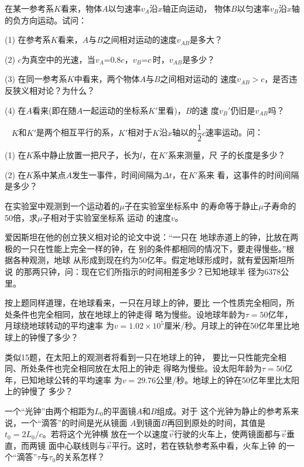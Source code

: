 \begin{exercises}
\exercise 在某一参考系$K$看来，物体$A$以匀速率$v_A$沿$x$轴正向运动，
物体$B$以匀速率$v_B$沿$x$轴的负方向运动。试问：

(1) 在参考系\*$K$\*看来，\!$A$\*与\*$B$\*之间相对运动的速度\*$v_{A\!B}$\*是多大？

(2) $c$\*为真空中的光速，当\*$ v _ { A }$=0.8$ c $，\!$ v _ { B }$=$ c  $\,时，\!$v_{A\!B}$\*是多少？

(3) 在同一参考系$K$中看来，两个物体$A$与$B$之间相对运动的
速度$ v _ { A B } > c  $，是否违反狭义相对论？为什么？

(4) 在$A$看来(即在随$A$一起运动的坐标系$K'$里看)，$B$的速
度$ v _ B ' $仍旧是$v_{AB}$吗？

\exercise~ $K$和$K'$是两个相互平行的系，$K'$相对于$K$沿$x$轴以的$\dfrac { 1 } { 2 } c $速率运动。问：

(1) 在$K$系中静止放置一把尺子，长为$l$，在$K'$系来测量，尺
子的长度是多少？

(2) 在$K$系中某点$A$发生一事件，时间间隔为$\Delta t$，在$K'$系来
看，这事件的时间间隔是多少？

\exercise 在实验室中观测到一个运动着的$\mu$子在实验室坐标系中
的寿命等于静止$\mu$子寿命的50倍，求$\mu$子相对于实验室坐标系
运动
的速度$v$。

\exercise 爱因斯坦在他的创立狭义相对论的论文中说：“一只在
地球赤道上的钟，比放在两极的一只在性能上完全一样的钟，在
别的条件都相同的情况下，要走得慢些。”根据各种观测，地球
从形成到现在约为50亿年。假定地球形成时，就有爱因斯坦所说
的那两只钟，问：现在它们所指示的时间相差多少？已知地球半
径为6378公里。\vspace{-0.14em}

\exercise 按上题同样道理，在地球看来，一只在月球上的钟，要比
一个性质完全相同，所处条件也完全相同，放在地球上的钟走得
略为慢些。设地球年龄为$ \tau = 5 0  $亿年，月球绕地球转动的平均速率
为$ v = 1 . 0 2 \times 1 0 ^ { 5 }  $厘米/秒。月球上的钟在50亿年里比地球上的钟慢了多少？\vspace{-0.14em}

\exercise 类似15题，在太阳上的观测者将看到一只在地球上的钟，
要比一只性能完全相同、所处条件也完全相同放在太阳上的钟走
得略为慢些。设太阳年龄为$ \tau = 5 0  $亿年，已知地球公转的平均速率
为$ v = 2 9 . 7 6  $公里/秒。地球上的钟在50亿年里比太阳上的钟慢了
多少？\vspace{-0.14em}

\exercise 一个“光钟”由两个相距为$ L _ { 0 }  $的平面镜$A$和$B$组成。对于
这个光钟为静止的参考系来说，一个“滴答”的时间是光从镜面
$A$到镜面$B$再回到原处的时间，其值是$ t _ { 0 } = 2 L _ { 0 }  /c$。若将这个光钟横
放在一个以速度$\vec{v}$行驶的火车上，使两镜面都与$\vec{v}$垂直，而两镜
面中心联线则与$\vec{v}$平行。这时，若在铁轨参考系中看，火车上钟
的一个“滴答”$\tau$与$\tau _ 0$的关系怎样？\vspace{-0.14em}


\end{exercises}
